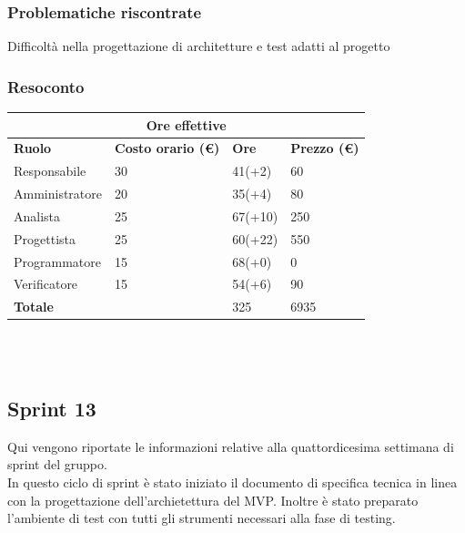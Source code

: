 \documentclass[9pt]{article}
\begin{document}
\subsubsection{Problematiche riscontrate}
Difficoltà nella progettazione di architetture e test adatti al progetto


\subsubsection{Resoconto}
\begin{center}
	\begin{tabularx}{\textwidth}{|X|X|X|X|}
		\hline
		\multicolumn{4}{|c|}{\textbf{Ore effettive}}                                      \\
		\hline
		\hline
		\textbf{Ruolo}  & \textbf{Costo orario (\euro)} & \textbf{Ore} & \textbf{Prezzo (\euro)} \\
		\hline
		Responsabile    & 30                            & 41(+2)       & 60                      \\
		\hline
		Amministratore  & 20                            & 35(+4)       & 80                      \\
		\hline
		Analista        & 25                            & 67(+10)       & 250                       \\
		\hline
		Progettista     & 25                            & 60(+22)       & 550                     \\
		\hline
		Programmatore   & 15                            & 68(+0)       & 0                     \\
		\hline
		Verificatore    & 15                            & 54(+6)       & 90                      \\
		\hline
		\hline
		\textbf{Totale} &                               & 325          & 6935                    \\
		\hline
	\end{tabularx}\\[8pt]
	\mbox{}\\
\end{center}


\subsection{Sprint 13}
Qui vengono riportate le informazioni relative alla quattordicesima settimana di sprint del gruppo. \\
In questo ciclo di sprint è stato iniziato il documento di specifica tecnica in linea con la progettazione dell'archietettura del MVP. 
Inoltre è stato preparato l'ambiente di test con tutti gli strumenti necessari alla fase di testing.\\
\end{document}
